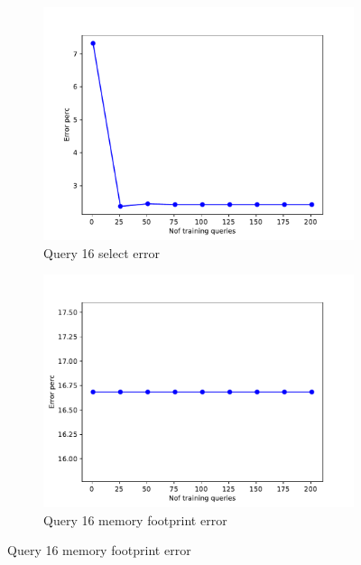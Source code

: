 \begin{figure}[!htb]
    \begin{subfigure}[t]{0.5\textwidth}
      \includegraphics[scale=0.4]{figs/tpch10/tpch10_sel16_error.pdf}
      \caption{Query 16 select error}
      \label{fig:tpch_sel16}
     \end{subfigure}
     \begin{subfigure}[t]{0.5\textwidth}
       \includegraphics[scale=0.4]{figs/tpch10/tpch10_q16_memerror.pdf}
       \caption{Query 16 memory footprint error}
       \label{fig:tpch_mem16}
     \end{subfigure}


\end{figure}

